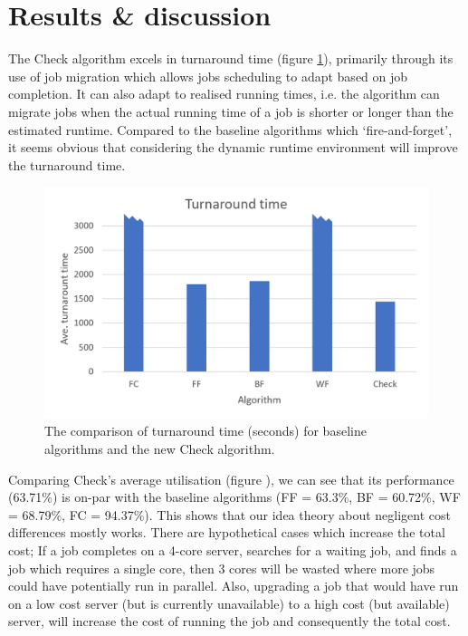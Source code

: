 \documentclass[a4paper]{article} %
\begin{document}
\section{Results \& discussion}

The Check algorithm excels in turnaround time (figure \ref{fig:turn}), primarily through its use of job migration which allows jobs scheduling to adapt based on job completion. It can also adapt to realised running times, i.e. the algorithm can migrate jobs when the actual running time of a job is shorter or longer than the estimated runtime. Compared to the baseline algorithms which ‘fire-and-forget’, it seems obvious that considering the dynamic runtime environment will improve the turnaround time. \par

\begin{figure}
    \centering
    \includegraphics{turnGraph.png}
    \caption{The comparison of turnaround time (seconds) for baseline algorithms and the new Check algorithm.}
    \label{fig:turn}
\end{figure}

Comparing Check’s average utilisation (figure \label{fig:util}), we can see that its performance (63.71\%) is on-par with the baseline algorithms (FF = 63.3\%, BF = 60.72\%, WF = 68.79\%, FC = 94.37\%). This shows that our idea theory about negligent cost differences mostly works. There are hypothetical cases which increase the total cost; If a job completes on a 4-core server, searches for a waiting job, and finds a job which requires a single core, then 3 cores will be wasted where more jobs could have potentially run in parallel. Also, upgrading a job that would have run on a low cost server (but is currently unavailable) to a high cost (but available) server, will increase the cost of running the job and consequently the total cost.
\end{document}
